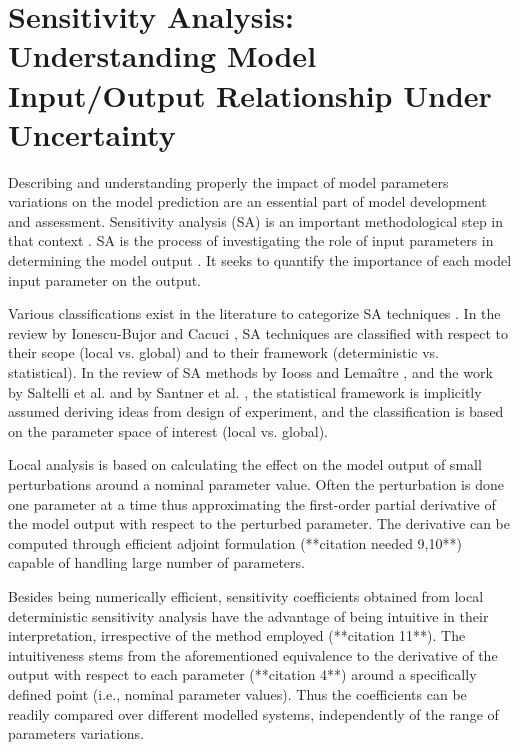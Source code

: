 \chapter[Sensitivity Analysis]{Sensitivity Analysis: Understanding Model Input/Output Relationship Under Uncertainty}\label{ch:sensitivity_analysis}

Describing and understanding properly the impact of model parameters variations on the model prediction are an essential part of model development and assessment. 
Sensitivity analysis (SA) is an important methodological step in that context \cite{Trucano2006}.
SA is the process of investigating the role of input parameters in determining the model output \cite{Iooss2015}. 
It seeks to quantify the importance of each model input parameter on the output.

Various classifications exist in the literature to categorize SA techniques \cite{Frey2002, Ionescu-Bujor2004, Cacuci2004, Saltelli2008, Iooss2015}.
In the review by Ionescu-Bujor and Cacuci \cite{Ionescu-Bujor2004, Cacuci2004}, 
SA techniques are classified with respect to their scope (local vs. global) and to their framework (deterministic vs. statistical).
In the review of SA methods by Iooss and Lemaître \cite{Iooss2015}, 
and the work by Saltelli et al. \cite{Saltelli2008} and by Santner et al. \cite{Santner2003}, 
the statistical framework is implicitly assumed deriving ideas from design of experiment, 
and the classification is based on the parameter space of interest (local vs. global).

Local analysis is based on calculating the effect on the model output of small perturbations around a nominal parameter value. 
Often the perturbation is done one parameter at a time thus approximating the first-order partial derivative of the model output with respect to the perturbed parameter. 
The derivative can be computed through efficient adjoint formulation (**citation needed 9,10**) capable of handling large number of parameters.

Besides being numerically efficient, 
sensitivity coefficients obtained from local deterministic sensitivity analysis have the advantage of being intuitive in their interpretation, 
irrespective of the method employed (**citation 11**). 
The intuitiveness stems from the aforementioned equivalence to the derivative of the output with respect to each parameter (**citation 4**) around a specifically defined point (i.e., nominal parameter values). 
Thus the coefficients can be readily compared over different modelled systems, independently of the range of parameters variations.

